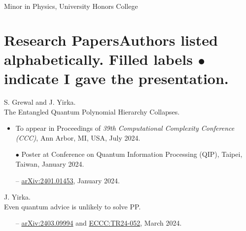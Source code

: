 \documentclass[11pt,letterpaper,serif]{moderncv}
\newcommand{\pubItemSep}{0em}
\begin{document}
\vspace{-\parsep}
{%
}
{
	\begin{adjustwidth}{.25in}{}
		Minor in Physics, University Honors College
	\end{adjustwidth}
}

\section{Research Papers\hfill{\footnotesize Authors listed alphabetically. Filled labels $\bullet$ indicate I gave the presentation.}}


S. Grewal and J. Yirka.
\\The Entangled Quantum Polynomial Hierarchy Collapses.
\begin{adjustwidth}{.1in}{}
	\begin{itemize}[itemsep=\pubItemSep]
		\item To appear in Proceedings of \textit{39th Computational Complexity Conference (CCC)}, Ann Arbor, MI, USA, July 2024.
		\item[$\bullet$] Poster at Conference on Quantum Information Processing (QIP), Taipei, Taiwan, January 2024.
		\item[--] \href{https://arxiv.org/abs/2401.01453}{arXiv:2401.01453}, January 2024.
	\end{itemize}
\end{adjustwidth}
\vspace{\parsep}

J. Yirka.
\\Even quantum advice is unlikely to solve \textup{PP}.
\begin{adjustwidth}{.1in}{}
	\begin{itemize}[itemsep=\pubItemSep]
		\item[--] \href{https://arxiv.org/abs/2403.09994}{arXiv:2403.09994} and \href{https://eccc.weizmann.ac.il/report/2024/052/}{ECCC:TR24-052}, March 2024.
	\end{itemize}
\end{adjustwidth}
\vspace{\parsep}
\end{document}
